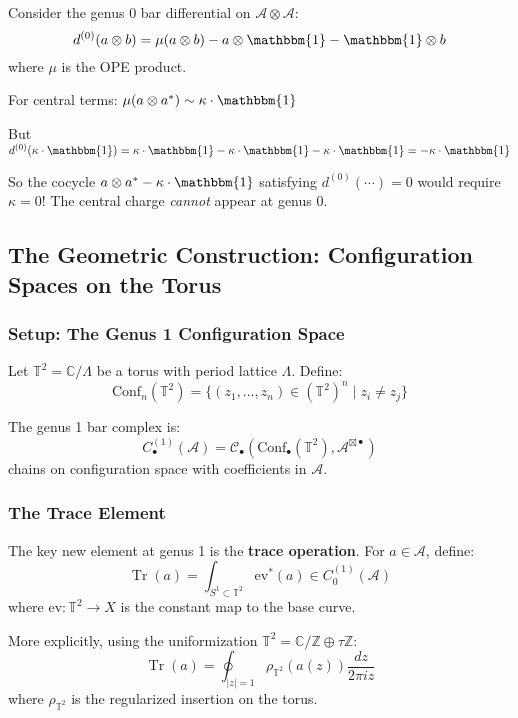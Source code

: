 Consider the genus 0 bar differential on $\mathcal{A} \otimes \mathcal{A}$:
$$d^{(0)}(a \otimes b) = \mu(a \otimes b) - a \otimes \mathbbm{1} - \mathbbm{1} \otimes b$$
where $\mu$ is the OPE product.

For central terms: $\mu(a \otimes a^*) \sim \kappa \cdot \mathbbm{1}$

But $d^{(0)}(\kappa \cdot \mathbbm{1}) = \kappa \cdot \mathbbm{1} - \kappa \cdot \mathbbm{1} - \kappa \cdot \mathbbm{1} = -\kappa \cdot \mathbbm{1}$

So the cocycle $a \otimes a^* - \kappa \cdot \mathbbm{1}$ satisfying $d^{(0)}(\cdots) = 0$
would require $\kappa = 0$! The central charge \emph{cannot} appear at genus 0.

\subsection{The Geometric Construction: Configuration Spaces on the Torus}

\subsubsection{Setup: The Genus 1 Configuration Space}

Let $\mathbb{T}^2 = \mathbb{C}/\Lambda$ be a torus with period lattice $\Lambda$.
Define:
$$\mathrm{Conf}_n(\mathbb{T}^2) = \{ (z_1, \ldots, z_n) \in (\mathbb{T}^2)^n \mid z_i \neq z_j \}$$

The genus 1 bar complex is:
$$C_{\bullet}^{(1)}(\mathcal{A}) = \mathcal{C}_{\bullet}(\mathrm{Conf}_{\bullet}(\mathbb{T}^2), 
\mathcal{A}^{\boxtimes \bullet})$$
chains on configuration space with coefficients in $\mathcal{A}$.

\subsubsection{The Trace Element}

The key new element at genus 1 is the \textbf{trace operation}. For $a \in \mathcal{A}$,
define:
$$\operatorname{Tr}(a) = \int_{S^1 \subset \mathbb{T}^2} \mathrm{ev}^*(a) \in C_0^{(1)}(\mathcal{A})$$
where $\mathrm{ev}: \mathbb{T}^2 \to X$ is the constant map to the base curve.

More explicitly, using the uniformization $\mathbb{T}^2 = \mathbb{C}/\mathbb{Z} \oplus \tau \mathbb{Z}$:
$$\operatorname{Tr}(a) = \oint_{|z| = 1} \rho_{\mathbb{T}^2}(a(z)) \frac{dz}{2\pi i z}$$
where $\rho_{\mathbb{T}^2}$ is the regularized insertion on the torus.

